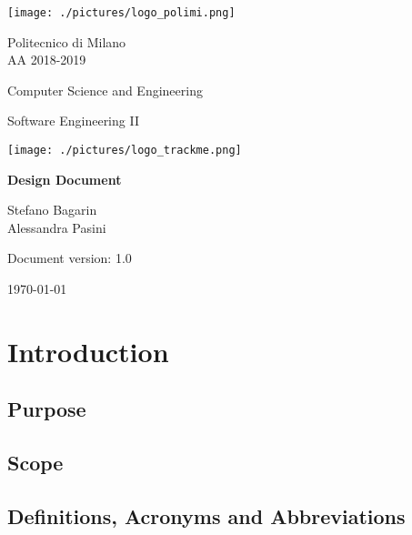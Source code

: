 \documentclass[a4paper,12pt]{report}
\begin{document}
	\begin{titlepage}
		\centering
		\texttt{[image: ./pictures/logo\_polimi.png]}\par

		{Politecnico di Milano \\ AA 2018-2019} \par
		\vspace{1.5cm}

		{Computer Science and Engineering}\par
		\Large{Software Engineering II}\par
		\vspace{1.0cm}

		\texttt{[image: ./pictures/logo\_trackme.png]}\par
		{\LARGE \textbf{Design Document} \par}
		\vspace{1.0cm}
		{\Large Stefano Bagarin\\ Alessandra Pasini\par}
		\vspace{2cm}
		\vfill

		{\large Document version: 1.0\par}
		{\large \today \par}
	\end{titlepage}

	\tableofcontents

	\chapter{Introduction}
	\label{ch:Introduction}

	\section{Purpose}
	

	\section{Scope}
	

	\section{Definitions, Acronyms and Abbreviations}
	
\end{document}
